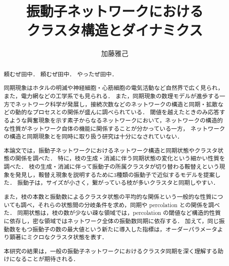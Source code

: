\documentclass[system, bachelor]{systemB}%
\title{振動子ネットワークにおける\\クラスタ構造とダイナミクス}
\author{加藤雅己}
\theoremstyle{break}
\begin{document}
\maketitle%

\frontmatter%



\begin{abstract}%
  頼むぜ田中．
  頼むぜ田中．
  やったぜ田中．
  
  同期現象はホタルの明滅や神経細胞・心筋細胞の電気活動など自然界で広く見られ，また，電力網などの工学系でも見られる．
  また，同期現象の数理モデルが進歩する一方でネットワーク科学が発展し，接続次数などのネットワークの構造と同期・拡散などの動的なプロセスとの関係が盛んに調べられている．  
  閾値を越えたときのみ応答するような興奮現象を示す素子からなるネットワークにおいて，ネットワークの構造的な性質がネットワーク自体の機能に関係することが分かっている一方，
  ネットワークの構造と同期現象とを同時に取り扱う研究は十分になされていない．
  
  本論文では，振動子ネットワークにおけるネットワーク構造と同期状態やクラスタ状態の関係を調べた．
  特に，枝の生成・消滅に伴う同期状態の変化という細かい性質を調べた．
  枝の生成・消滅に伴って振動子の所属クラスタが切り替わる鞍替えという現象を発見し，鞍替え現象を説明するために3種類の振動子で近似するモデルを提案した．
  振動子は，サイズが小さく，繋がっている枝が多いクラスタと同期しやすい．
  
  また，枝の本数と振動数によるクラスタ状態の平均的な関係という一般的な性質についても調べ，それらの状態間の分岐条件を求め，同期や percolation との関係を調べた．
  同期状態は，枝の数が少ない疎な領域では，percolation の閾値など構造的性質に依存し，密な領域ではネットワーク全体の振動数同期に依存する．
  加えて，同じ振動数をもつ振動子の数の最大値という新たに導入した指標は，オーダーパラメータより顕著にミクロなクラスタ状態を表す．
  
  本研究の結果は，一般の振動子ネットワークにおけるクラスタ同期を深く理解する助けになることが期待される．
\end{abstract}


{\makeatletter
\let\ps@jpl@in\ps@empty
\makeatother
\pagestyle{empty}
\tableofcontents
\clearpage}
\end{document}
